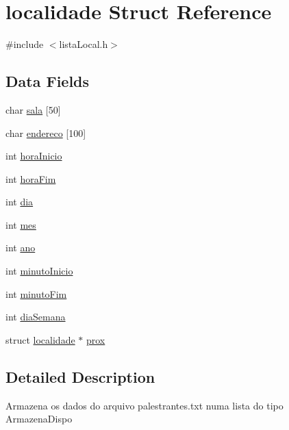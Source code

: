 \hypertarget{structlocalidade}{}\section{localidade Struct Reference}
\label{structlocalidade}


{\ttfamily \#include $<$lista\+Local.\+h$>$}

\subsection*{Data Fields}
\begin{DoxyCompactItemize}
\item 
char \hyperlink{structlocalidade_a7609c4270fb3307a06848edee43c1957}{sala} \mbox{[}50\mbox{]}
\item 
char \hyperlink{structlocalidade_a0d6302e50f7d24f08d9bdf8187fecca3}{endereco} \mbox{[}100\mbox{]}
\item 
int \hyperlink{structlocalidade_a5495bac9e9c2b1154d018a03a2786397}{hora\+Inicio}
\item 
int \hyperlink{structlocalidade_abade366a6a790fc6164d1b360522e6e3}{hora\+Fim}
\item 
int \hyperlink{structlocalidade_a3d1171ac670a8e8a672c481f22d1fa9f}{dia}
\item 
int \hyperlink{structlocalidade_a9fc86758220eae0e735655f81fd9d9bc}{mes}
\item 
int \hyperlink{structlocalidade_ac404d93cbf0169fd9e89edc17d0c5572}{ano}
\item 
int \hyperlink{structlocalidade_a12abfd10f7bc791e8ec4f457078271c6}{minuto\+Inicio}
\item 
int \hyperlink{structlocalidade_af994944b0c6881ec51c00cf9c1a1aa10}{minuto\+Fim}
\item 
int \hyperlink{structlocalidade_ae690627c5917afdb91c1cd98478cea7e}{dia\+Semana}
\item 
struct \hyperlink{structlocalidade}{localidade} $\ast$ \hyperlink{structlocalidade_a727939630bcae691100192e273b88900}{prox}
\end{DoxyCompactItemize}


\subsection{Detailed Description}
Armazena os dados do arquivo \textquotesingle{}palestrantes.\+txt\textquotesingle{} numa lista do tipo \textquotesingle{}Armazena\+Dispo\textquotesingle{} 

